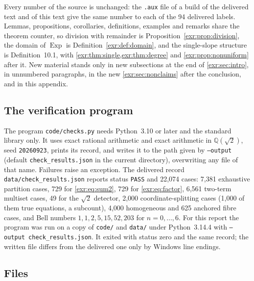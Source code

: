 \documentclass[11pt,letterpaper]{article}
\numberwithin{equation}{section}
\theoremstyle{definition}
\theoremstyle{remark}
\newcommand{\Q}{\mathbb Q}
\newcommand{\Exp}{\operatorname{Exp}}
\newcommand{\rpath}[1]{\nolinkurl{#1}}%
\begin{document}
Every number of the source is unchanged: the \texttt{.aux} file of a build of
the delivered text and of this text give the same number to each of the 94
delivered labels. Lemmas, propositions, corollaries, definitions, examples and
remarks share the theorem counter, so division with remainder is
Proposition~\ref{exr:prop:division}, the domain of $\Exp$ is
Definition~\ref{exr:def:domain}, and the single-slope structure is
Definition~10.1, with \cref{exr:thm:single,exr:thm:degree} and
\cref{exr:prop:nonuniform} after it. New material stands only in new
subsections at the end of \cref{exr:sec:intro}, in unnumbered paragraphs, in
the new \cref{exr:sec:nonclaims} after the conclusion, and in this appendix.

\subsection{The verification program}\label{exr:app:suite}

The program \rpath{code/checks.py} needs Python~3.10 or later and the
standard library only. It uses exact rational arithmetic and exact arithmetic
in $\Q(\sqrt2)$, seed \texttt{20260923}, prints its record, and writes it to
the path given by \texttt{--output} (default \rpath{check_results.json} in the
current directory), overwriting any file of that name. Failures raise an
exception. The delivered record \rpath{data/check_results.json} reports status
\texttt{PASS} and 22,074 cases: 7,381 exhaustive partition cases, 729 for
\eqref{exr:eq:sum2}, 729 for \eqref{exr:eq:factor}, 6,561 two-term multiset
cases, 49 for the $\sqrt2$ detector, 2,000 coordinate-splitting cases (1,000 of
them true equations, a subcount), 4,000 homogeneous and 625 anchored fibre
cases, and Bell numbers $1,1,2,5,15,52,203$ for $n=0,\ldots,6$. For this
report the program was run on a copy of \rpath{code/} and \rpath{data/} under
Python~3.14.4 with \texttt{--output check\_results.json}. It exited with
status zero and the same record; the written file differs from the delivered
one only by Windows line endings.

\subsection{Files}\label{exr:app:files}
\end{document}
